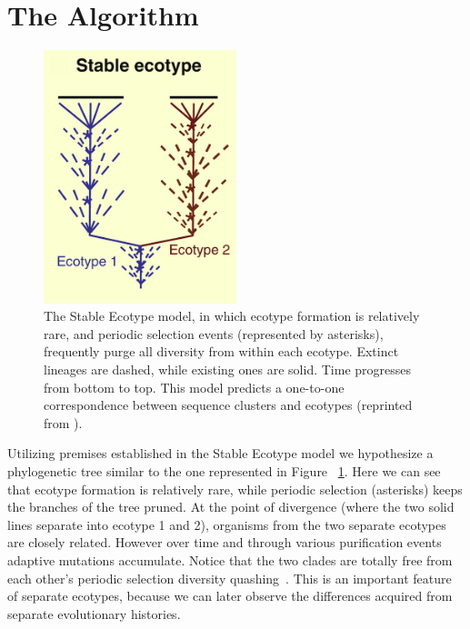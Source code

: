 \section{The Algorithm}

\begin{figure}
 \caption[Phylogenetic tree representation of typical Stable Ecotype model case.]{ The Stable Ecotype model, in which ecotype formation is relatively rare, and periodic selection events (represented by asterisks), frequently purge all diversity from within each ecotype. Extinct lineages are dashed, while existing ones are solid. Time progresses from bottom to top. This model predicts a one-to-one correspondence between sequence clusters and ecotypes (reprinted from \protect\cite{cohan2008origins}). }
 \centering
 \label{fig:StableTree}
 \includegraphics[width=0.5\textwidth]{images/StableTree-CH2}
\end{figure}

Utilizing premises established in the Stable Ecotype model we hypothesize a phylogenetic tree similar to the one represented in Figure ~\ref{fig:StableTree}.
Here we can see that ecotype formation is relatively rare, while periodic selection (asterisks) keeps the branches of the tree pruned.
At the point of divergence (where the two solid lines separate into ecotype 1 and 2), organisms from the two separate ecotypes are closely related.
However over time and through various purification events adaptive mutations accumulate.
Notice that the two clades are totally free from each other's periodic selection diversity quashing~\cite{cohan2007systematics}.
This is an important feature of separate ecotypes, because we can later observe the differences acquired from separate evolutionary histories.

